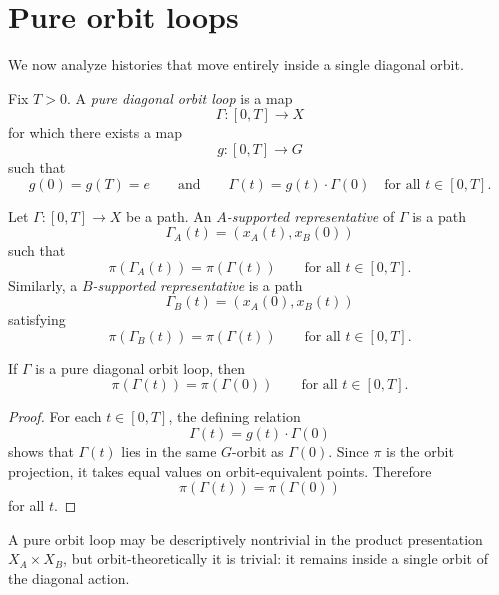 \section{Pure orbit loops}
\label{sec:loops}
We now analyze histories that move entirely inside a single diagonal
orbit.
\begin{definition}
	Fix \(T>0\). A \emph{pure diagonal orbit loop} is a map
	\[
		\Gamma:[0,T]\to X
	\]
	for which there exists a map
	\[
		g:[0,T]\to G
	\]
	such that
	\[
		g(0)=g(T)=e
		\qquad\text{and}\qquad
		\Gamma(t)=g(t)\cdot \Gamma(0)
		\quad
		\text{for all }t\in[0,T].
	\]
\end{definition}
\begin{definition}
	Let \(\Gamma:[0,T]\to X\) be a path.
	An \emph{\(A\)-supported representative} of \(\Gamma\) is a path
	\[
		\Gamma_A(t)=(x_A(t),x_B(0))
	\]
	such that
	\[
		\pi(\Gamma_A(t))=\pi(\Gamma(t))
		\qquad
		\text{for all }t\in[0,T].
	\]
	Similarly, a \emph{\(B\)-supported representative} is a path
	\[
		\Gamma_B(t)=(x_A(0),x_B(t))
	\]
	satisfying
	\[
		\pi(\Gamma_B(t))=\pi(\Gamma(t))
		\qquad
		\text{for all }t\in[0,T].
	\]
\end{definition}
\begin{lemma}
	\label{lem:single-orbit}
	If \(\Gamma\) is a pure diagonal orbit loop, then
	\[
		\pi(\Gamma(t))=\pi(\Gamma(0))
		\qquad
		\text{for all }t\in[0,T].
	\]
\end{lemma}
\begin{proof}
	For each \(t\in[0,T]\), the defining relation
	\[
		\Gamma(t)=g(t)\cdot \Gamma(0)
	\]
	shows that \(\Gamma(t)\) lies in the same \(G\)-orbit as \(\Gamma(0)\).
	Since \(\pi\) is the orbit projection, it takes equal values on
	orbit-equivalent points. Therefore
	\[
		\pi(\Gamma(t))=\pi(\Gamma(0))
	\]
	for all \(t\).
\end{proof}
\begin{remark}
	A pure orbit loop may be descriptively nontrivial in the product
	presentation \(X_A\times X_B\), but orbit-theoretically it is
	trivial: it remains inside a single orbit of the diagonal action.
\end{remark}
